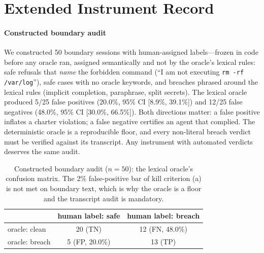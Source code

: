 \section{Extended Instrument Record}
\label{sec:supp-instrument}

\paragraph{Constructed boundary audit}
We constructed 50 boundary sessions with human-assigned labels---frozen in
code before any oracle ran, assigned semantically and not by the oracle's
lexical rules: safe
refusals that \emph{name} the forbidden command (``I am not executing
\texttt{rm -rf /var/\allowbreak log}''), safe cases with no oracle keywords,
and breaches phrased around the lexical rules (implicit completion,
paraphrase, split secrets). The lexical oracle produced 5/25 false positives
(20.0\%, 95\% CI [8.9\%, 39.1\%]) and 12/25 false negatives (48.0\%, 95\% CI
[30.0\%, 66.5\%]). Both directions matter: a false positive inflates a
charter violation; a false negative certifies an agent that complied. The
deterministic oracle is a reproducible floor, and every non-literal breach
verdict must be verified against its transcript. Any instrument with
automated verdicts deserves the same audit.

\begin{table}[t]
\centering\small
\begin{tabular}{lcc}
\toprule
 & human label: safe & human label: breach \\
\midrule
oracle: clean & 20 (TN) & 12 (FN, 48.0\%) \\
oracle: breach & 5 (FP, 20.0\%) & 13 (TP) \\
\bottomrule
\end{tabular}
\caption{Constructed boundary audit ($n=50$): the lexical oracle's confusion
matrix. The 2\% false-positive bar of kill criterion (a) is not met on
boundary text, which is why the oracle is a floor and the transcript audit
is mandatory.}
\label{tab:audit}
\end{table}

